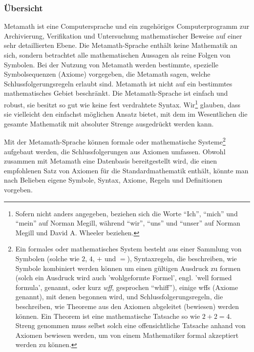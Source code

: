 
\subsubsection{Übersicht}

Metamath ist eine Computersprache und ein zugehöriges Computerprogramm zur Archivierung, Verifikation und Untersuchung mathematischer Beweise auf einer sehr detaillierten Ebene. Die Metamath-Sprache enthält keine Mathematik an sich, sondern betrachtet alle mathematischen Aussagen als reine Folgen von Symbolen. Bei der Nutzung von Metamath werden bestimmte, spezielle Symbolsequenzen (Axiome) vorgegeben, die Metamath sagen, welche Schlussfolgerungsregeln erlaubt sind. Metamath ist nicht auf ein bestimmtes mathematisches Gebiet beschränkt.  Die Metamath-Sprache ist einfach und robust, sie besitzt so gut wie keine fest verdrahtete Syntax.
Wir\footnote{Sofern nicht anders angegeben, beziehen sich die Worte "`Ich"', "`mich"' und "`mein"' auf Norman Megill, während "`wir"', "`uns"' und "`unser"' auf Norman Megill und David A. Wheeler beziehen.}
glauben, dass sie vielleicht den einfachst möglichen Ansatz bietet, mit dem im Wesentlichen die gesamte Mathematik mit absoluter Strenge ausgedrückt werden kann.


Mit der Metamath-Sprache können formale oder mathematische Systeme\footnote{Ein formales oder mathematisches System besteht aus einer Sammlung von Symbolen (solche wie $2$, $4$, $+$ und $=$), Syntaxregeln, die beschreiben, wie Symbole kombiniert werden können um einen gültigen Ausdruck zu formen (solch ein Ausdruck wird auch 'wohlgeformte Formel', engl. 'well formed formula', genannt, oder kurz {\em wff}, gesprochen "`whiff"'), einige wffs (Axiome genannt), mit denen begonnen wird, und Schlussfolgerungsregeln, die beschreiben, wie Theoreme aus den Axiomen abgeleitet (bewiesen) werden können. Ein Theorem ist eine mathematische Tatsache so wie $2+2=4$. Streng genommen muss selbst solch eine offensichtliche Tatsache anhand von Axiomen bewiesen werden, um von einem Mathematiker formal akzeptiert werden zu können.} aufgebaut werden, die Schlussfolgerungen aus Axiomen umfassen.  Obwohl zusammen mit Metamath eine Datenbasis bereitgestellt wird, die einen empfohlenen Satz von Axiomen für die Standardmathematik enthält, könnte man nach Belieben eigene Symbole, Syntax, Axiome, Regeln und Definitionen vorgeben.

